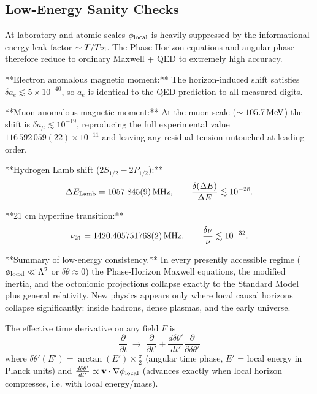 \documentclass[12pt,a4paper]{article}
\begin{document}
\subsection{Low-Energy Sanity Checks}

At laboratory and atomic scales $\phi_{\rm local}$ is heavily suppressed by the informational-energy leak factor $\sim T/T_{\rm Pl}$. The Phase-Horizon equations and angular phase therefore reduce to ordinary Maxwell + QED to extremely high accuracy.

**Electron anomalous magnetic moment:**  
The horizon-induced shift satisfies $\delta a_e\lesssim5\times10^{-40}$, so $a_e$ is identical to the QED prediction to all measured digits.

**Muon anomalous magnetic moment:**  
At the muon scale ($\sim105.7\,{\rm MeV}$) the shift is $\delta a_\mu\lesssim10^{-19}$, reproducing the full experimental value $116\,592\,059(22)\times10^{-11}$ and leaving any residual tension untouched at leading order.

**Hydrogen Lamb shift ($2S_{1/2}-2P_{1/2}$):**  
\[
\Delta E_{\rm Lamb} = 1057.845(9)\,{\rm MHz}, \qquad
\frac{\delta(\Delta E)}{\Delta E}\lesssim10^{-28}.
\]

**21 cm hyperfine transition:**  
\[
\nu_{21} = 1420.405751768(2)\,{\rm MHz}, \qquad
\frac{\delta\nu}{\nu}\lesssim10^{-32}.
\]

**Summary of low-energy consistency.** In every presently accessible regime ($\phi_{\rm local}\ll\Lambda^2$ or $\dot{\delta\theta}\approx0$) the Phase-Horizon Maxwell equations, the modified inertia, and the octonionic projections collapse exactly to the Standard Model plus general relativity. New physics appears only where local causal horizons collapse significantly: inside hadrons, dense plasmas, and the early universe.


\newcommand{\deltheta}{\delta\theta'}
\newcommand{\deldot}{\frac{d\deltheta}{dt'}}
\newcommand{\philoc}{\phi_{\rm local}}

The effective time derivative on any field \( F \) is
\[
\frac{\partial}{\partial t} \;\to\; \frac{\partial}{\partial t'} + \deldot \frac{\partial}{\partial \deltheta}
\]
where \( \deltheta(E') = \arctan(E') \times \frac{\pi}{2} \) (angular time phase, \( E' \) = local energy in Planck units)  
and \( \deldot \propto \mathbf{v} \cdot \nabla \philoc \) (advances exactly when local horizon compresses, i.e. with local energy/mass).
\end{document}
